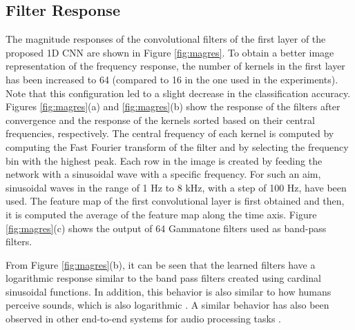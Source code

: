 \documentclass[preprint,final,12pt]{elsarticle}
\begin{document}
\subsection{Filter Response}
\label{sec:filred}
The magnitude responses of the convolutional filters of the first layer of the proposed 1D CNN are shown in Figure \ref{fig:magres}. To obtain a better image representation of the frequency response, the number of kernels in the first layer has been increased to 64 (compared to 16 in the one used in the experiments). Note that this configuration led to a slight decrease in the classification accuracy. Figures \ref{fig:magres}(a) and \ref{fig:magres}(b) show the response of the filters after convergence and the response of the kernels sorted based on their central frequencies, respectively. The central frequency of each kernel is computed by computing the Fast Fourier transform of the filter and by selecting the frequency bin with the highest peak. Each row in the image is created by feeding the network with a sinusoidal wave with a specific frequency. For such an aim, sinusoidal waves in the range of 1 Hz to 8 kHz, with a step of 100 Hz, have been used. The feature map of the first convolutional layer is first obtained and then, it is computed the average of the feature map along the time axis. Figure \ref{fig:magres}(c) shows the output of 64 Gammatone filters used as band-pass filters.

\begin{figure*}[htpb!]\centering
{}\caption{Magnitude response of the convolutional filters of the first layer of the end-to-end 1D CNN: (a) response of the filters after convergence; (b) response of the kernels after sorting based on their central frequency; (c) frequency response of band pass filters. Center frequency of filters are selected according to constant $Q$ transform rules \citep{brown1991calculation}.}
\label{fig:magres}
\end{figure*}

From Figure \ref{fig:magres}(b), it can be seen that the learned filters have a logarithmic response similar to the band pass filters created using cardinal sinusoidal functions. In addition, this behavior is also similar to how humans perceive sounds, which is also logarithmic \citep{roederer2008physics}. A similar behavior has also been observed in other end-to-end systems for audio processing tasks \citep{hoshen2015speech, sainath2015learning, tokozumeENV}.
\end{document}
